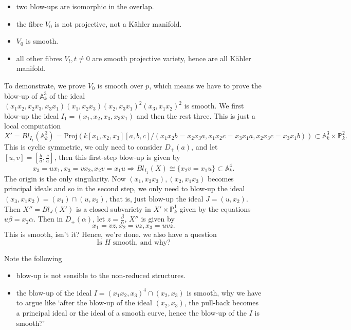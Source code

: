 \documentclass[../main.tex]{subfiles}
\begin{document}
\begin{example}
\begin{itemize}
\item two blow-ups are isomorphic in the overlap.
\item the fibre $V_{0}$ is not projective, not a Kähler manifold.
\item $V_{0}$ is smooth.
\item all other fibres $V_{t}, t\neq 0$ are smooth projective variety, hence are all Kähler manifold.
\end{itemize}
To demonstrate, we prove $V_{0}$ is smooth over $p$, which means we have to prove the blow-up of $\mathbb{A}_{k}^{3}$ of the ideal $(x_{1}x_{2},x_{2}x_{3}, x_{3}x_{1})(x_{1}, x_{2}x_{3})(x_{2},x_{3}x_{1})^{2}(x_{3},x_{1}x_{2})^{2}$ is smooth. We first blow-up the ideal $I_{1}=(x_{1},x_{2},x_{3}, x_{3}x_{1})$ and then the rest three. This is just a local computation
$$X'=Bl_{I_{1}}(\mathbb{A}_{k}^{3})=\mathrm{Proj}(k[x_{1},x_{2}, x_{3}][a,b,c]/(x_{1}x_{2}b=x_{2}x_{3}a, x_{1}x_{2}c=x_{3}x_{1}a,x_{2}x_{3}c=x_{3}x_{1}b))\subset \mathbb{A}_{k}^{3}\times \mathbb{P}_{k}^{2}.$$
This is cyclic symmetric, we only need to consider $D_{+}(a)$, and let $[u,v]=[\frac{b}{a}, \frac{c}{a}]$, then this first-step blow-up is given by 
$$x_{3}=ux_{1}, x_{3}=vx_{2}, x_{2}v=x_{1}u\Rightarrow Bl_{I_{1}}(X)\cong \{x_{2}v=x_{1}u\}\subset \mathbb{A}_{k}^{4}.$$
The origin is the only singularity. Now $(x_{1}, x_{2}x_{3}), (x_{2},x_{1}x_{3})$ becomes principal ideals and so in the second step, we only need to blow-up the ideal $(x_{3}, x_{1}x_{2})=(x_{1})\cap (u,x_{2})$, that is, just blow-up the ideal $J=(u, x_{2}).$ Then $X''=Bl_{J}(X')$ is a closed subvariety in $X'\times \mathbb{P}_{k}^{1}$ given by the equations $u\beta=x_{2}\alpha.$ Then in $D_{+}(\alpha)$, let $z=\frac{\beta}{\alpha}$, $X''$ is given by
$$x_{1}=vz, x_{2}=vz, x_{3}=uvz.$$
This is smooth, isn't it? Hence, we're done. we also have a question 
$$\text{Is $H$ smooth, and why?}$$
\end{example}
\begin{remark}
Note the following 
\begin{itemize}
\item blow-up is not sensible to the non-reduced structures.
\item the blow-up of the ideal $I=(x_{1}x_{2},x_{3})^{4}\cap (x_{2},x_{3})$ is smooth, why we have to argue like `after the blow-up of the ideal $(x_{2},x_{3})$, the pull-back becomes a principal ideal or the ideal of a smooth curve, hence the blow-up of the $I$ is smooth?'
\end{itemize}
\end{remark}
\end{document}
